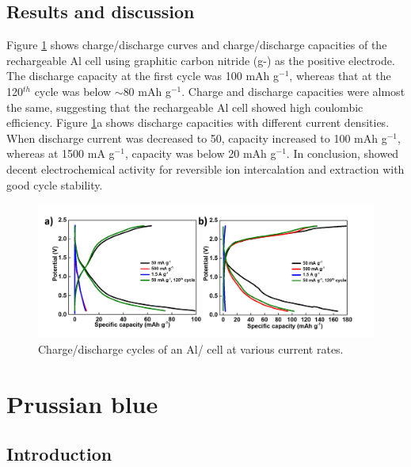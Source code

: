 \subsection{Results and discussion}
Figure \ref{Figures/chap6fig:C3N4cdc} shows charge/discharge curves and charge/discharge capacities of the rechargeable Al cell using graphitic carbon nitride (g-) as the positive electrode. The discharge capacity at the first cycle was 100 mAh g$^{-1}$, whereas that at the 120$^{th}$ cycle was below $\sim$80 mAh g$^{-1}$. Charge and discharge capacities were almost the same, suggesting that the rechargeable Al cell showed high coulombic efficiency. Figure \ref{Figures/chap6fig:C3N4cdc}a shows discharge capacities with different current densities. When discharge current was decreased to 50, capacity increased to 100 mAh g$^{-1}$, whereas at 1500 mA g$^{-1}$, capacity was below 20 mAh g$^{-1}$. In conclusion,  showed decent electrochemical activity for reversible ion intercalation and extraction with good cycle stability. 

\begin{figure}[th!]
\centering
\includegraphics[width=\textwidth]{Figures/chap6fig/C3N4cdc}
\caption{Charge/discharge cycles of an Al/ cell at various current rates.}
\label{Figures/chap6fig:C3N4cdc}
\end{figure}

\section{Prussian blue}

\subsection{Introduction}

